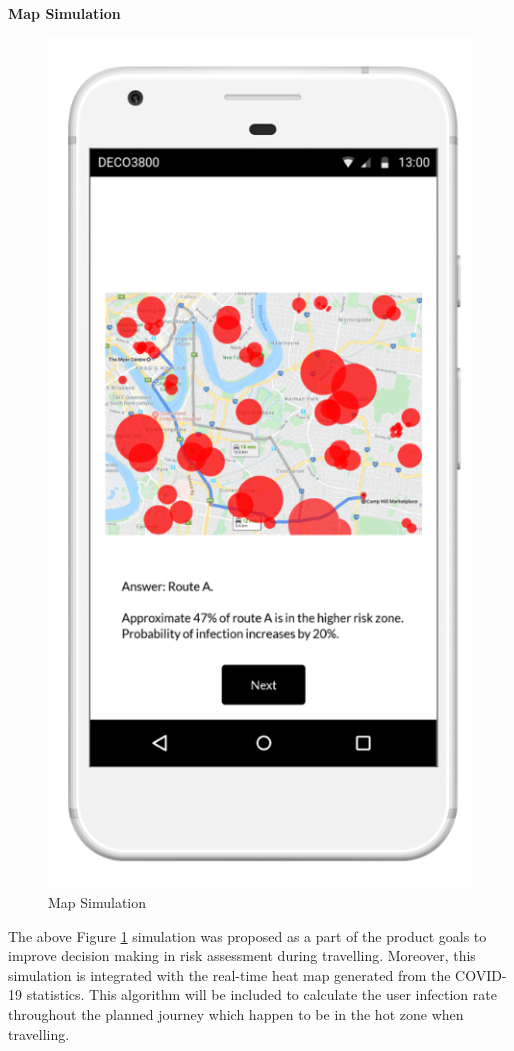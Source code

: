       \vspace{0.5cm}
      \par \textbf{Map Simulation}
      \vspace{0.5cm}
      \begin{figure}[H]
        \centering
        \includegraphics[scale=1]{img/digital-prototype/map-simulation.png}
        \caption{Map Simulation}
        \label{fig:digi-proto-01}
      \end{figure}
      \par The above Figure \ref{fig:digi-proto-01} simulation was proposed as a part of the product goals to improve decision making in risk assessment during travelling. Moreover, this simulation is integrated with the real-time heat map generated from the COVID-19 statistics. This algorithm will be included to calculate the user infection rate throughout the planned journey which happen to be in the hot zone when travelling.
